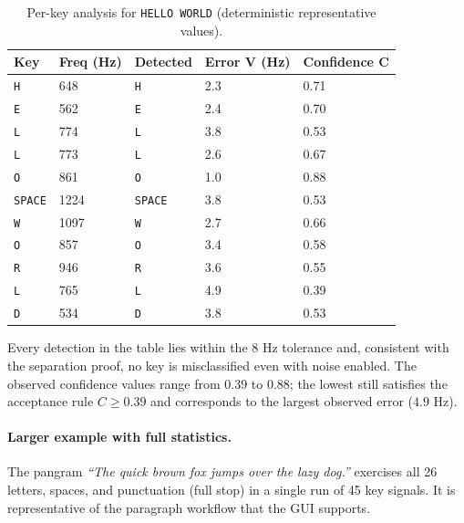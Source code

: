 \documentclass[11pt,a4paper]{article}
\newcommand{\Key}[1]{\texttt{#1}}
\begin{document}
\begin{table}[H]
    \centering
    \begin{tabular}{@{}lllll@{}}
        \toprule
        \textbf{Key} & \textbf{Freq (Hz)} & \textbf{Detected} &
        \textbf{Error V (Hz)} & \textbf{Confidence C} \\
        \midrule
        \Key{H} & 648 & \Key{H} & 2.3 & 0.71 \\
        \Key{E} & 562 & \Key{E} & 2.4 & 0.70 \\
        \Key{L} & 774 & \Key{L} & 3.8 & 0.53 \\
        \Key{L} & 773 & \Key{L} & 2.6 & 0.67 \\
        \Key{O} & 861 & \Key{O} & 1.0 & 0.88 \\
        \Key{SPACE} & 1224 & \Key{SPACE} & 3.8 & 0.53 \\
        \Key{W} & 1097 & \Key{W} & 2.7 & 0.66 \\
        \Key{O} & 857 & \Key{O} & 3.4 & 0.58 \\
        \Key{R} & 946 & \Key{R} & 3.6 & 0.55 \\
        \Key{L} & 765 & \Key{L} & 4.9 & 0.39 \\
        \Key{D} & 534 & \Key{D} & 3.8 & 0.53 \\
        \bottomrule
    \end{tabular}
    \caption{Per-key analysis for \Key{HELLO WORLD} (deterministic
             representative values).}
    \label{tab:perkey}
\end{table}

Every detection in the table lies within the $8$ Hz tolerance and, consistent
with the separation proof, no key is misclassified even with noise enabled. The
observed confidence values range from $0.39$ to $0.88$; the lowest still
satisfies the acceptance rule $C \ge 0.39$ and corresponds to the largest
observed error ($4.9$ Hz).

\paragraph{Larger example with full statistics.}
The pangram \emph{``The quick brown fox jumps over the lazy dog.''} exercises
all 26 letters, spaces, and punctuation (full stop) in a single run of 45 key
signals. It is representative of the paragraph workflow that the GUI supports.
\end{document}
